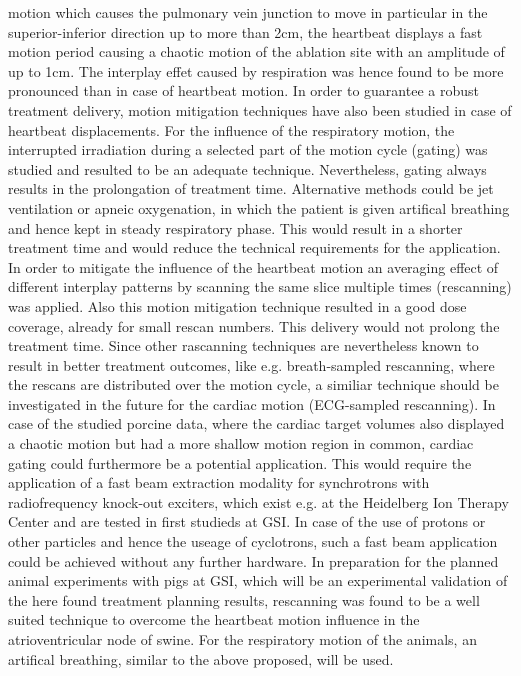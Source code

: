 \documentclass[type=dr, dr=rernat, accentcolor=tud7b,colorbacktitle, bigchapter, openright, twoside, 12pt ]{tudthesis}
\begin{document}
motion which causes the pulmonary vein junction to move in particular in the superior-inferior direction up to more than 2cm, the heartbeat 
displays a fast motion period causing a chaotic motion of the ablation site with an amplitude of up to 1cm. The interplay effet caused by 
respiration was hence found to be more pronounced than in case of heartbeat motion. In order to guarantee a robust treatment 
delivery, motion mitigation techniques have also been studied in case of heartbeat displacements. 
For the influence of the respiratory motion, the interrupted irradiation during a selected part of the motion cycle (gating) was studied and 
resulted to be an adequate technique. Nevertheless, gating always results in the prolongation of treatment time. Alternative methods could be
jet ventilation or apneic oxygenation, in which the patient is given artifical breathing and hence kept in steady respiratory phase. 
This would result in a shorter treatment time and would reduce the technical requirements for the application. 
In order to mitigate the influence of the heartbeat motion an averaging effect of different interplay patterns by scanning the same slice 
multiple times (rescanning) was applied. Also this motion mitigation technique resulted in a good dose coverage, already for small rescan numbers. 
This delivery would not prolong the treatment time. Since other rascanning techniques are nevertheless known to result in better treatment outcomes, like e.g. 
breath-sampled rescanning, where the rescans are distributed over the motion cycle, a similiar technique should be investigated in the 
future for the cardiac motion (ECG-sampled rescanning). In case of the studied porcine data, where the cardiac target volumes also displayed 
a chaotic motion but had a more shallow motion region in common, cardiac gating could furthermore be a potential application. This would 
require the application of a fast beam extraction modality for synchrotrons with radiofrequency knock-out exciters, which exist e.g. at the 
Heidelberg Ion Therapy Center \cite{Sch11} and are tested in first studieds at GSI. In case of the use of protons or other particles and hence 
the useage of cyclotrons, such a fast beam application could be achieved without any further hardware. In preparation for the planned 
animal experiments with pigs at GSI, which will be an experimental validation of the here found treatment planning results, rescanning 
was found to be a well suited technique to overcome the heartbeat motion influence in the atrioventricular node of swine. For the respiratory 
motion of the animals, an artifical breathing, similar to the above proposed, will be used. \newline
\end{document}
